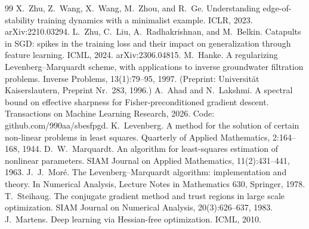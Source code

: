 \documentclass[11pt]{article}
\theoremstyle{definition}
\theoremstyle{remark}
\begin{document}
\begin{thebibliography}{99}
 X.~Zhu, Z.~Wang, X.~Wang, M.~Zhou, and R.~Ge. Understanding edge-of-stability training dynamics with a minimalist example. ICLR, 2023. arXiv:2210.03294.
 L.~Zhu, C.~Liu, A.~Radhakrishnan, and M.~Belkin. Catapults in SGD: spikes in the training loss and their impact on generalization through feature learning. ICML, 2024. arXiv:2306.04815.
 M.~Hanke. A regularizing Levenberg--Marquardt scheme, with applications to inverse groundwater filtration problems. Inverse Problems, 13(1):79--95, 1997. (Preprint: Universit\"at Kaiserslautern, Preprint Nr.~283, 1996.)
 A.~Ahad and N.~Lakshmi. A spectral bound on effective sharpness for Fisher-preconditioned gradient descent. Transactions on Machine Learning Research, 2026. Code: github.com/990aa/sbesfpgd.
 K.~Levenberg. A method for the solution of certain non-linear problems in least squares. Quarterly of Applied Mathematics, 2:164--168, 1944.
 D.~W.~Marquardt. An algorithm for least-squares estimation of nonlinear parameters. SIAM Journal on Applied Mathematics, 11(2):431--441, 1963.
 J.~J.~Mor\'e. The Levenberg--Marquardt algorithm: implementation and theory. In Numerical Analysis, Lecture Notes in Mathematics 630, Springer, 1978.
 T.~Steihaug. The conjugate gradient method and trust regions in large scale optimization. SIAM Journal on Numerical Analysis, 20(3):626--637, 1983.
 J.~Martens. Deep learning via Hessian-free optimization. ICML, 2010.
\end{thebibliography}
\end{document}
